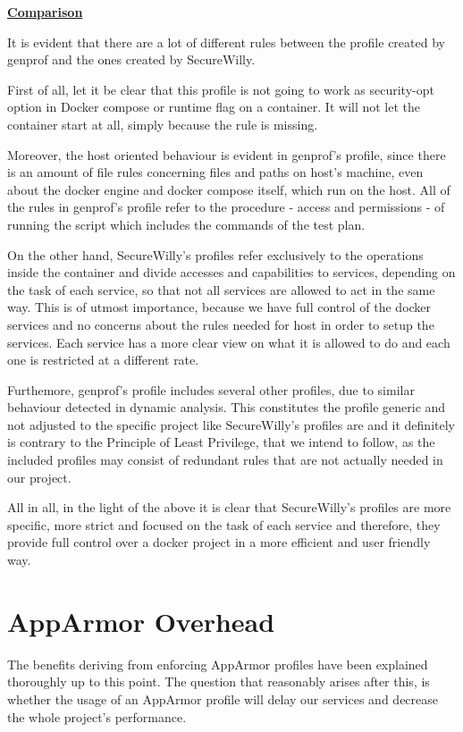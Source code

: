 \hfill\break

\textbf{\underline{Comparison}}
\hfill\break

It is evident that there are a lot of different rules between the profile created by genprof and the ones created by SecureWilly.

First of all, let it be clear that this profile is not going to work as security-opt option in Docker compose or runtime flag on a container. It will not let the container start at all, simply because the  rule is missing.

Moreover, the host oriented behaviour is evident in genprof's profile, since there is an amount of file rules concerning files and paths on host's machine, even about the docker engine and docker compose itself, which run on the host. All of the rules in genprof's profile refer to the procedure - access and permissions - of running the script which includes the commands of the test plan.

On the other hand, SecureWilly's profiles refer exclusively to the operations inside the container and divide accesses and capabilities to services, depending on the task of each service, so that not all services are allowed to act in the same way. This is of utmost importance, because we have full control of the docker services and no concerns about the rules needed for host in order to setup the services. Each service has a more clear view on what it is allowed to do and each one is restricted at a different rate.

Furthemore, genprof's profile includes several other profiles, due to similar behaviour detected in dynamic analysis. This constitutes the profile generic and not adjusted to the specific project like SecureWilly's profiles are and it definitely is contrary to the Principle of Least Privilege, that we intend to follow, as the included profiles may consist of redundant rules that are not actually needed in our project.

All in all, in the light of the above it is clear that SecureWilly's profiles are more specific, more strict and focused on the task of each service and therefore, they provide full control over a docker project in a more efficient and user friendly way.

\section{AppArmor Overhead}

The benefits deriving from enforcing AppArmor profiles have been explained thoroughly up to this point. The question that reasonably arises after this, is whether the usage of an AppArmor profile will delay our services and decrease the whole project's performance. 

